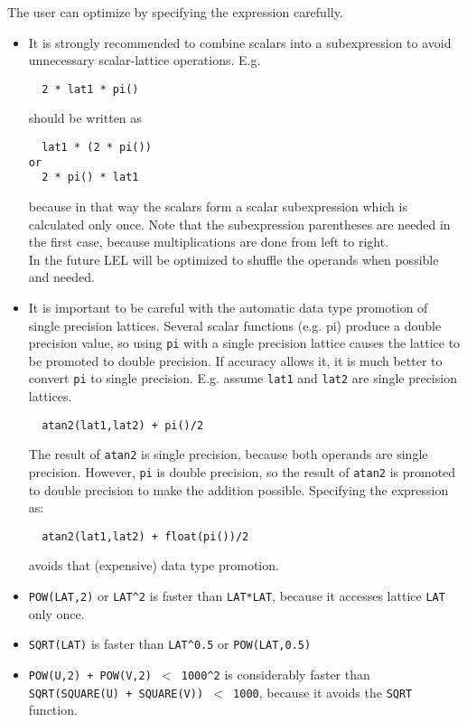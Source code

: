 The user can optimize by specifying the expression carefully.
\begin{itemize}
\item
It is strongly recommended to combine scalars into a subexpression to
avoid unnecessary scalar-lattice operations. E.g.
\begin{verbatim}
  2 * lat1 * pi()
\end{verbatim}
should be written as
\begin{verbatim}
  lat1 * (2 * pi())
or
  2 * pi() * lat1
\end{verbatim}
because in that way the scalars form a scalar subexpression
which is calculated only once. Note that the subexpression parentheses
are needed in the first case, because multiplications are done from
left to right.
\\In the future LEL will be optimized to shuffle the operands when
possible and needed.

\item
It is important to be careful with the automatic data type promotion
of single precision lattices. Several scalar functions (e.g. pi)
produce a double precision value, so using \texttt{pi} with a
single precision lattice causes the lattice to be promoted to double
precision. If accuracy allows it, it is much better to convert
\texttt{pi} to single precision.
E.g. assume \texttt{lat1} and \texttt{lat2} are single precision lattices.
\begin{verbatim}
  atan2(lat1,lat2) + pi()/2
\end{verbatim}
The result of \texttt{atan2} is single precision, because both
operands are single precision. However, \texttt{pi} is double
precision, so the result of \texttt{atan2} is promoted to double
precision to make the addition possible. Specifying the expression as:
\begin{verbatim}
  atan2(lat1,lat2) + float(pi())/2
\end{verbatim}
avoids that (expensive) data type promotion.

\item
\texttt{POW(LAT,2)} or \texttt{LAT}\verb+^+\texttt{2}
is faster than \texttt{LAT*LAT}, because it accesses lattice
\texttt{LAT} only once.

\item
\texttt{SQRT(LAT)} is faster than \texttt{LAT}\verb+^+\texttt{0.5}
or \texttt{POW(LAT,0.5)}

\item
\texttt{POW(U,2) + POW(V,2) $<$ 1000}\verb+^+\texttt{2} is considerably faster
than
\\\texttt{SQRT(SQUARE(U) + SQUARE(V)) $<$ 1000}, because it avoids the
\texttt{SQRT} function.


\end{itemize}
